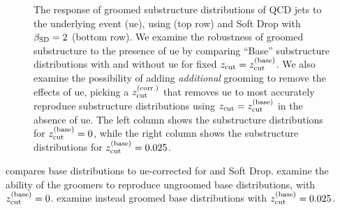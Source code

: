 \begin{figure}[p]
{        \label{fig:sd_ue_025}
    }
    \caption[The response of groomed substructure distributions of QCD jets to , using  and Soft Drop with \(\beta_{\rm SD} = 2\).]{
        The response of groomed substructure distributions of QCD jets to the underlying event (\gls{ue}), using  (top row) and Soft Drop with \(\beta_{\rm SD} = 2\) (bottom row).
        We examine the robustness of groomed substructure to the presence of \gls{ue} by comparing ``Base'' substructure distributions with and without \gls{ue} for fixed \(z_{\rm cut} = z^{(\rm base)}_{\rm cut}\).
        We also examine the possibility of adding \textit{additional} grooming to remove the effects of \gls{ue}, picking a \(z^{(\rm corr.)}_{\rm cut}\) that removes \gls{ue} to most accurately reproduce substructure distributions using \(z_{\rm cut} = z^{(\rm base)}_{\rm cut}\) in the absence of \gls{ue}.
        The left column shows the substructure distributions for \(z^{(\rm base)}_{\rm cut} = 0\), while the right column shows the substructure distributions for \(z^{(\rm base)}_{\rm cut} = 0.025\).
    }
    \label{fig:ue}
\end{figure}


 compares base distributions to \gls{ue-corrected} for  and Soft Drop.
%
 examine the ability of the groomers to reproduce ungroomed base distributions, with \(z_{\rm cut}^{(\rm base)} = 0\).
%
 examine instead groomed base distributions with \(z_{\rm cut}^{(\rm base)} = 0.025\).

